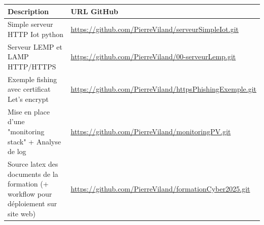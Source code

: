 \documentclass[french, 12pt]{article}%
\begin{document}
\footnotesize
\begin{tabular}{|>{\raggedright\arraybackslash}p{6cm}|>{\raggedright\arraybackslash}p{8cm}|}
\hline
\rowcolor{vert_capet} \textbf{Description} & \textbf{URL GitHub} \\
\hline
Simple serveur HTTP Iot python& \url{https://github.com/PierreViland/serveurSimpleIot.git} \\


\hline
Serveur LEMP et LAMP HTTP/HTTPS& \url{https://github.com/PierreViland/00-serveurLemp.git} \\
\hline
Exemple fishing avec certificat Let's encrypt& \url{https://github.com/PierreViland/httpsPhishingExemple.git} \\
\hline

\hline
Mise en place d'une "monitoring stack" + Analyse de log & \url{https://github.com/PierreViland/monitoringPV.git} \\
\hline
Source latex des documents de la formation (+ workflow pour déploiement sur site web) & \url{https://github.com/PierreViland/formationCyber2025.git} \\
\hline
\end{tabular}

\normalsize
\end{document}
